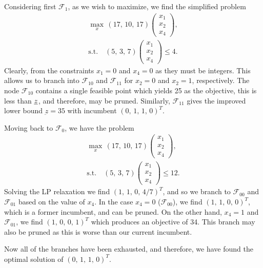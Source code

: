 \documentclass[11pt,a4paper]{article}
\begin{document}
\begin{enumerate}[i)]
	Considering first $\mathcal{F}_1$, as we wish to maximize, we find the simplified problem
	\begin{gather*}
		\max_x \, (17, \, 10, \, 17)
		\begin{pmatrix}
			x_1 \\
			x_2 \\
			x_4
		\end{pmatrix}, \\
		\text{s.t.} \quad (5, \, 3, \, 7)
		\begin{pmatrix}
			x_1 \\
			x_2 \\
			x_4
		\end{pmatrix}
		\leq 4.
	\end{gather*}
	Clearly, from the constraints $x_1 = 0$ and $x_4 = 0$ as they must be integers. This allows us to branch into $\mathcal{F}_{10}$ and $\mathcal{F}_{11}$ for $x_2 = 0$ and $x_2 = 1$, respectively. The node $\mathcal{F}_{10}$ contains a single feasible point which yields 25 as the objective, this is less than $\underbar{$z$}$, and therefore, may be pruned. Similarly, $\mathcal{F}_{11}$ gives the improved lower bound $\underbar{z} = 35$ with incumbent $(0, \, 1, \, 1, \, 0)^T$.

	Moving back to $\mathcal{F}_{0}$, we have the problem
	\begin{gather*}
		\max_x \, (17, \, 10, \, 17)
		\begin{pmatrix}
			x_1 \\
			x_2 \\
			x_4
		\end{pmatrix}, \\
		\text{s.t.} \quad (5, \, 3, \, 7)
		\begin{pmatrix}
			x_1 \\
			x_2 \\
			x_4
		\end{pmatrix}
		\leq 12.
	\end{gather*}
	Solving the LP relaxation we find $(1, \, 1, \, 0, \, 4/7)^T$, and so we branch to $\mathcal{F}_{00}$ and $\mathcal{F}_{01}$ based on the value of $x_4$. In the case $x_4 = 0$ ($\mathcal{F}_{00}$), we find $(1, \, 1, \, 0, \, 0)^T$, which is a former incumbent, and can be pruned. On the other hand, $x_4 = 1$ and $\mathcal{F}_{01}$, we find $(1, \, 0, \, 0, \, 1)^T$ which produces an objective of 34. This branch may also be pruned as this is worse than our current incumbent.

	Now all of the branches have been exhausted, and therefore, we have found the optimal solution of $(0, \, 1, \, 1, \, 0)^T$.
\end{enumerate}
\end{document}
